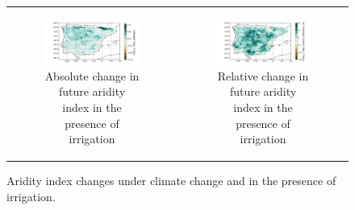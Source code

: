 \begin{figure}[htbp]
\begin{tabular}{cc}
        \begin{subfigure}[b]{0.5\textwidth}
            \caption{Absolute change in future aridity index in the presence of irrigation}
            \includegraphics[width=\textwidth]{images/chap4/future/diffmap_aridity_index_futirr.png}
        \end{subfigure} &
        \begin{subfigure}[b]{0.5\textwidth}
            \caption{Relative change in future aridity index in the presence of irrigation}
            \includegraphics[width=\textwidth]{images/chap4/future/reldiffmap_aridity_index_futirr.png}
        \end{subfigure} \\
    \end{tabular}
    \caption{Aridity index changes under climate change and in the presence of irrigation.}
    \label{fig:diffmaps_aridity}
\end{figure}

